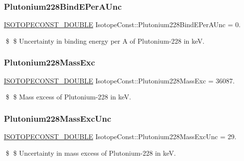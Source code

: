 \subsubsection{\texorpdfstring{Plutonium228\+Bind\+E\+Per\+A\+Unc}{Plutonium228BindEPerAUnc}}
{\footnotesize\ttfamily \mbox{\hyperlink{group___isotope_const-_macros_ga8f45a7272ce02c0b4c65c44636ed719a}{I\+S\+O\+T\+O\+P\+E\+C\+O\+N\+S\+T\+\_\+\+D\+O\+U\+B\+LE}} Isotope\+Const\+::\+Plutonium228\+Bind\+E\+Per\+A\+Unc = 0.}

\$ \$ Uncertainty in binding energy per A of Plutonium-\/228 in keV. \mbox{\label{group___isotope_const-_plutonium-_pu228_ga0069bf5f1b1163b22a5db5e1a40ddfa5}} 
\subsubsection{\texorpdfstring{Plutonium228\+Mass\+Exc}{Plutonium228MassExc}}
{\footnotesize\ttfamily \mbox{\hyperlink{group___isotope_const-_macros_ga8f45a7272ce02c0b4c65c44636ed719a}{I\+S\+O\+T\+O\+P\+E\+C\+O\+N\+S\+T\+\_\+\+D\+O\+U\+B\+LE}} Isotope\+Const\+::\+Plutonium228\+Mass\+Exc = 36087.}

\$ \$ Mass excess of Plutonium-\/228 in keV. \mbox{\label{group___isotope_const-_plutonium-_pu228_gabb1b5feab487dbce2687d469ebc5dcb7}} 
\subsubsection{\texorpdfstring{Plutonium228\+Mass\+Exc\+Unc}{Plutonium228MassExcUnc}}
{\footnotesize\ttfamily \mbox{\hyperlink{group___isotope_const-_macros_ga8f45a7272ce02c0b4c65c44636ed719a}{I\+S\+O\+T\+O\+P\+E\+C\+O\+N\+S\+T\+\_\+\+D\+O\+U\+B\+LE}} Isotope\+Const\+::\+Plutonium228\+Mass\+Exc\+Unc = 29.}

\$ \$ Uncertainty in mass excess of Plutonium-\/228 in keV. \mbox{\label{group___isotope_const-_plutonium-_pu228_gab5bd7025d2551e1d7c0bdb2a60dbaa82}} 
